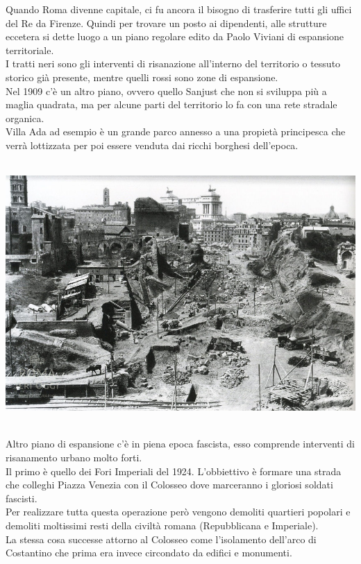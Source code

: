 \documentclass[a4paper,12pt, oneside]{book}
\begin{document}
  Quando Roma divenne capitale, ci fu ancora il bisogno di trasferire tutti gli uffici del Re da Firenze. Quindi per trovare un posto ai dipendenti, alle strutture eccetera si dette luogo a un piano regolare edito da Paolo Viviani di espansione territoriale.\\
  I tratti neri sono gli interventi di risanazione all'interno del territorio o tessuto storico già presente, mentre quelli rossi sono zone di espansione.\\
  Nel 1909 c'è un altro piano, ovvero quello Sanjust che non si sviluppa più a maglia quadrata, ma per alcune parti del territorio lo fa con una rete stradale organica.\\
  Villa Ada ad esempio è un grande parco annesso a una propietà principesca che verrà lottizzata per poi essere venduta dai ricchi borghesi dell'epoca.\\\\
  \begin{center}
  	\includegraphics[width=0.6\linewidth]{"immagini/Demolitions-in-Via-dei-Fori-Imperiali-Rome-1932"}
  	\label{fig:Demolitions-in-Via-dei-Fori-Imperiali-Rome-1932}
  \end{center}
  \leavevmode\\
  Altro piano di espansione c'è in piena epoca fascista, esso comprende interventi di risanamento urbano molto forti.\\
  Il primo è quello dei Fori Imperiali del 1924. L'obbiettivo è formare una strada che colleghi Piazza Venezia con il Colosseo dove marceranno i gloriosi soldati fascisti.\\
  Per realizzare tutta questa operazione però vengono demoliti quartieri popolari e demoliti moltissimi resti della civiltà romana (Repubblicana e Imperiale).\\
  La stessa cosa successe attorno al Colosseo come l'isolamento dell'arco di Costantino che prima era invece circondato da edifici e monumenti.\\\\
\end{document}
